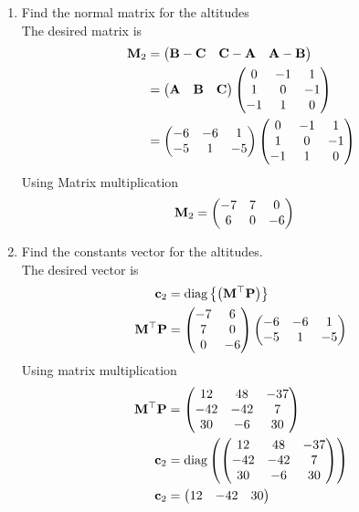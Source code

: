 \documentclass[11pt]{book}
\begin{document}
  
\begin{enumerate}[label=\thesubsection.\arabic*.,ref=\thesubsection.\theenumi]
\item Find the normal matrix for the altitudes \\
\solution  The desired matrix is 
\begin{align}
\mathbf{M}_2 &= \begin{pmatrix}\mathbf{B}-\mathbf{C} & \mathbf{C}-\mathbf{A} & \mathbf{A}-\mathbf{B} \end{pmatrix}
\\
&= 
\begin{pmatrix}\mathbf{A} & \mathbf{B} &\mathbf{C}\end{pmatrix}
\begin{pmatrix} 0 & -1 & 1 \\ 1 & 0 & -1 \\ -1 & 1 & 0\end{pmatrix} \\
&= 
\begin{pmatrix}-6 & -6 & 1 \\ -5 & 1 & -5\end{pmatrix}
\begin{pmatrix} 0 & -1 & 1 \\ 1 & 0 & -1 \\ -1 & 1 & 0\end{pmatrix}
\end{align}
Using Matrix multiplication 
\begin{align}
   \mathbf{M}_2 &=\begin{pmatrix}-7 & 7 & 0 \\ 6 & 0 & -6\end{pmatrix}
\end{align}
\item Find the constants vector for the altitudes. \\
\solution The desired vector is 
\begin{align}
\mathbf{c}_2 &= \text{diag}\left\{\left(\mathbf{M}^{\top}\mathbf{P}\right)\right\} \\
\mathbf{M}^{\top}\mathbf{P} &= \begin{pmatrix}-7&6 \\ 7&0 \\ 0 & -6\end{pmatrix}\begin{pmatrix}-6 & -6 & 1 \\ -5 & 1 & -5\end{pmatrix} \\
\end{align}
Using matrix multiplication
\begin{align}
 \mathbf{M}^{\top}\mathbf{P}    &=\begin{pmatrix} 12 & 48 & -37 \\ -42 & -42 & 7 \\ 30 & -6 & 30 \end{pmatrix} \\
    \mathbf{c}_2 &= \text{diag}\left( \begin{pmatrix} 12 & 48 & -37 \\ -42 & -42 & 7 \\ 30 & -6 & 30 \end{pmatrix} \right) \\
 \mathbf{c}_2   &= \begin{pmatrix} 12 & -42 & 30\end{pmatrix}
\end{align}
\end{enumerate}
\end{document}
